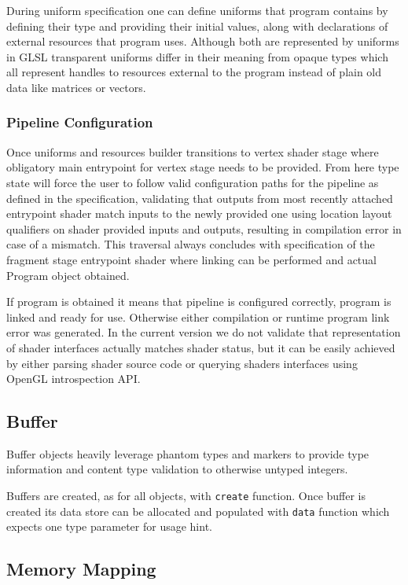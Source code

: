 During uniform specification one can define uniforms that program contains by defining their type and providing their initial values, along with declarations of external resources that program uses.
Although both are represented by uniforms in GLSL transparent uniforms differ in their meaning from opaque types which all represent handles to resources external to the program
instead of plain old data like matrices or vectors.

\subsubsection{Pipeline Configuration}

Once uniforms and resources builder transitions to vertex shader stage where obligatory main entrypoint for vertex stage needs to be provided.
From here type state will force the user to follow valid configuration paths for the pipeline as defined in the specification, 
validating that outputs from most recently attached entrypoint shader match inputs to the newly provided one using location layout qualifiers 
on shader provided inputs and outputs, resulting in compilation error in case of a mismatch. 
This traversal always concludes with specification of the fragment stage entrypoint shader where linking can be performed and actual Program object obtained.

If program is obtained it means that pipeline is configured correctly, program is linked and ready for use. Otherwise either compilation or runtime program link error was generated.
In the current version we do not validate that representation of shader interfaces actually matches shader status, but it can be easily achieved 
by either parsing shader source code or querying shaders interfaces using OpenGL introspection API.

\subsection{Buffer}

Buffer objects heavily leverage phantom types and markers to provide type information and content type validation to otherwise untyped integers.

Buffers are created, as for all objects, with \texttt{create} function.
Once buffer is created its data store can be allocated and populated with \texttt{data} function which expects one type parameter for usage hint.

\subsection{Memory Mapping}

